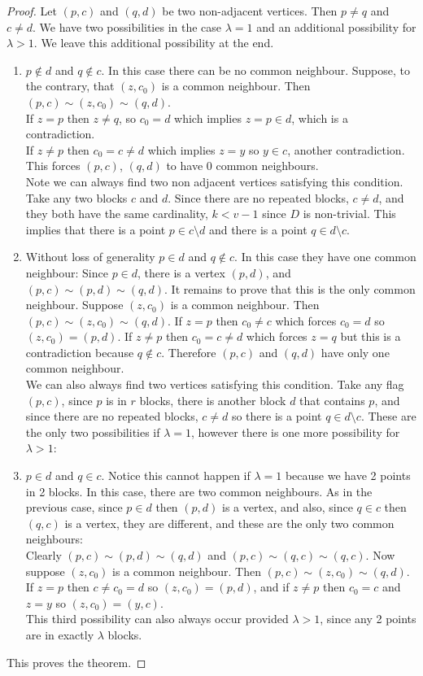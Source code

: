 \documentclass[letterpaper,10pt]{article}
\theoremstyle{plain}
\theoremstyle{definition}
\begin{document}
\begin{proof}
Let $(p,c)$ and $(q,d)$ be two non-adjacent vertices. Then $p\neq q$ and $c\neq d$. We have two possibilities in the case $\lambda=1$ and an additional possibility for $\lambda>1$. We leave this additional possibility at the end.
\begin{enumerate}
    \item $p\notin d$ and $q\notin c$. In this case there can be no common neighbour. Suppose, to the contrary, that $(z,c_0)$ is a common neighbour. Then $(p,c)\sim(z,c_0)\sim(q,d)$.\\
    If $z=p$ then $z\neq q$, so $c_0=d$ which implies $z=p\in d$, which is a contradiction.\\
    If $z\neq p$ then $c_0=c\neq d$ which implies $z=y$ so $y\in c$, another contradiction. This forces $(p,c)$, $(q,d)$ to have 0 common neighbours.\\
    Note we can always find two non adjacent vertices satisfying this condition. Take any two blocks $c$ and $d$. Since there are no repeated blocks, $c\neq d$, and they both have the same cardinality, $k<v-1$ since $D$ is non-trivial. This implies that there is a point $p\in c\setminus d$ and there is a point $q\in d\setminus c$.\\
    \item Without loss of generality  $p\in d$ and $q\notin c$. In this case they have one common neighbour: Since $p\in d$, there is a vertex $(p,d)$, and $(p,c)\sim(p,d)\sim(q,d)$. It remains to prove that this is the only common neighbour. Suppose $(z,c_0)$ is a common neighbour. Then $(p,c)\sim(z,c_0)\sim(q,d)$. If $z=p$ then $c_0\neq c$ which forces $c_0=d$ so $(z,c_0)=(p,d)$. If $z\neq p$ then $c_0=c\neq d$ which forces $z=q$ but this is a contradiction because $q\notin c$. Therefore $(p,c)$ and $(q,d)$ have only one common neighbour.\\
    We can also always find two vertices satisfying this condition. Take any flag $(p,c)$, since $p$ is in $r$ blocks, there is another block $d$ that contains $p$, and since there are no repeated blocks, $c\neq d$ so there is a point $q\in d\setminus c$.
    These are the only two possibilities if $\lambda=1$, however there is one more possibility for $\lambda>1$:
    \item $p\in d$ and $q\in c$. Notice this cannot happen if $\lambda=1$ because we have 2 points in 2 blocks. In this case, there are two common neighbours. As in the previous case, since $p\in d$ then $(p,d)$ is a vertex, and also, since $q\in c$ then $(q,c)$ is a vertex, they are different, and these are the only two common neighbours:\\
    Clearly $(p,c)\sim(p,d)\sim(q,d)$ and $(p,c)\sim(q,c)\sim(q,c)$. Now suppose $(z,c_0)$ is a common neighbour. Then $(p,c)\sim(z,c_0)\sim(q,d)$. If $z=p$ then $c\neq c_0=d$ so $(z,c_0)=(p,d)$, and if $z\neq p$ then $c_0=c$ and $z=y$ so $(z,c_0)=(y,c)$.\\
    This third possibility can also always occur provided $\lambda>1$, since any 2 points are in exactly $\lambda$ blocks. 
\end{enumerate}
     This proves the theorem.
 \end{proof}
\end{document}
